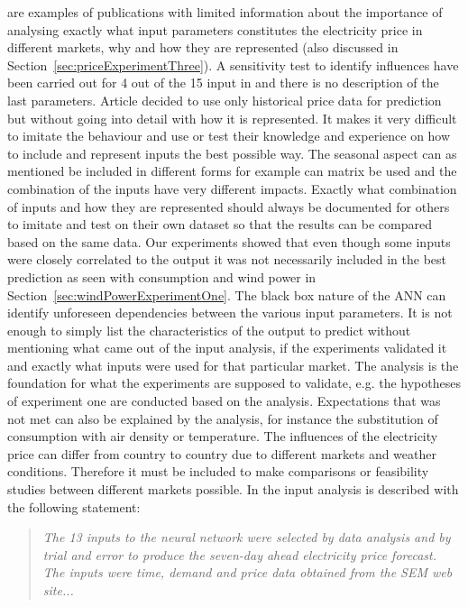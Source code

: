 \cite{szkuta1999electricity,sansom1999neural,1} are examples of publications with limited information about the importance of analysing exactly what input parameters constitutes the electricity price in different markets, why and how they are represented (also discussed in Section~\ref{sec:priceExperimentThree}). A sensitivity test to identify influences have been carried out for 4 out of the 15 input in \cite{szkuta1999electricity} and there is no description of the last parameters. Article \cite{1} decided to use only historical price data for prediction but without going into detail with how it is represented. It makes it very difficult to imitate the behaviour and use or test their knowledge and experience on how to include and represent inputs the best possible way. The seasonal aspect can as mentioned be included in different forms for example can matrix be used and the combination of the inputs have very different impacts. Exactly what combination of inputs and how they are represented should always be documented for others to imitate and test on their own dataset so that the results can be compared based on the same data. Our experiments showed that even though some inputs were closely correlated to the output it was not necessarily included in the best prediction as seen with consumption and wind power in Section~\ref{sec:windPowerExperimentOne}. The black box nature of the ANN can identify unforeseen dependencies between the various input parameters. It is not enough to simply list the characteristics of the output to predict without mentioning what came out of the input analysis, if the experiments validated it and exactly what inputs were used for that particular market. The analysis is the foundation for what the experiments are supposed to validate, e.g. the hypotheses of experiment one are conducted based on the analysis. Expectations that was not met can also be explained by the analysis, for instance the substitution of consumption with air density or temperature. The influences of the electricity price can differ from country to country due to different markets and weather conditions. Therefore it must be included to make comparisons or feasibility studies between different markets possible. In \cite{sansom1999neural} the input analysis is described with the following statement:

\begin{quotation}
\textit{The 13 inputs to the neural network were selected by data analysis and by trial and error to produce the seven-day ahead electricity price forecast. The inputs were time, demand and price data obtained from the SEM web site...}
\end{quotation}

